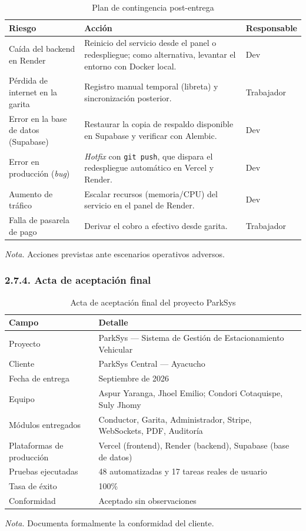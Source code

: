 \begin{table}[htbp]
\caption{Plan de contingencia post-entrega}
\label{tab:plan_contingencia}
\begin{tabular}{@{}p{4cm} p{8cm} p{3cm}@{}}
\toprule
\textbf{Riesgo} & \textbf{Acción} & \textbf{Responsable} \\
\midrule
Caída del backend en Render & Reinicio del servicio desde el panel o redespliegue; como alternativa, levantar el entorno con Docker local. & Dev \\
Pérdida de internet en la garita & Registro manual temporal (libreta) y sincronización posterior. & Trabajador \\
Error en la base de datos (Supabase) & Restaurar la copia de respaldo disponible en Supabase y verificar con Alembic. & Dev \\
Error en producción (\textit{bug}) & \textit{Hotfix} con \texttt{git push}, que dispara el redespliegue automático en Vercel y Render. & Dev \\
Aumento de tráfico & Escalar recursos (memoria/CPU) del servicio en el panel de Render. & Dev \\
Falla de pasarela de pago & Derivar el cobro a efectivo desde garita. & Trabajador \\
\bottomrule
\end{tabular}
\par\vspace{0.2cm}
\textit{Nota.} Acciones previstas ante escenarios operativos adversos.
\end{table}

\subsubsection{2.7.4. Acta de aceptación final}

\begin{table}[htbp]
\caption{Acta de aceptación final del proyecto ParkSys}
\label{tab:acta_aceptacion}
\begin{tabular}{@{}p{4.5cm} p{10.5cm}@{}}
\toprule
\textbf{Campo} & \textbf{Detalle} \\
\midrule
Proyecto & ParkSys --- Sistema de Gestión de Estacionamiento Vehicular \\
Cliente & ParkSys Central --- Ayacucho \\
Fecha de entrega & Septiembre de 2026 \\
Equipo & Aspur Yaranga, Jhoel Emilio; Condori Cotaquispe, Suly Jhomy \\
Módulos entregados & Conductor, Garita, Administrador, Stripe, WebSockets, PDF, Auditoría \\
Plataformas de producción & Vercel (frontend), Render (backend), Supabase (base de datos) \\
Pruebas ejecutadas & 48 automatizadas y 17 tareas reales de usuario \\
Tasa de éxito & 100\% \\
Conformidad & Aceptado sin observaciones \\
\bottomrule
\end{tabular}
\par\vspace{0.2cm}
\textit{Nota.} Documenta formalmente la conformidad del cliente.
\end{table}
